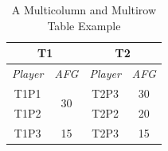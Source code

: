 \begin{table}[!bt]
	\renewcommand{\arraystretch}{1.3}
	\caption{A Multicolumn and Multirow Table Example}
	\label{tab:multi_example}
	\vspace{-2ex}
	\centering
 \begin{tabular}{c|c|c|c}
 \hline
\hline
 \multicolumn{2}{c|}{\textbf{T1}} & \multicolumn{2}{|c}{\textbf{T2}} \\
 \hline
 \textit{Player} & \textit{AFG} & \textit{Player} & \textit{AFG} \\
 \hline
 T1P1 & \multirow{2}[4]{*}{30} & T2P3 & 30 \\
\cline{1-1}\cline{3-4} T1P2 &       & T2P2 & 20 \\
 \hline
 T1P3  & 15    & T2P3  & 15 \\
 \hline
 \hline
 \end{tabular}%
\end{table}




